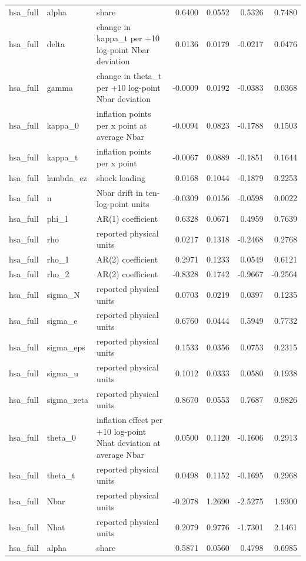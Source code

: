 \begin{tabular}{lllrrrr}
hsa\_full & alpha & share & 0.6400 & 0.0552 & 0.5326 & 0.7480 \\
hsa\_full & delta & change in kappa\_t per +10 log-point Nbar deviation & 0.0136 & 0.0179 & -0.0217 & 0.0476 \\
hsa\_full & gamma & change in theta\_t per +10 log-point Nbar deviation & -0.0009 & 0.0192 & -0.0383 & 0.0368 \\
hsa\_full & kappa\_0 & inflation points per x point at average Nbar & -0.0094 & 0.0823 & -0.1788 & 0.1503 \\
hsa\_full & kappa\_t & inflation points per x point & -0.0067 & 0.0889 & -0.1851 & 0.1644 \\
hsa\_full & lambda\_ez & shock loading & 0.0168 & 0.1044 & -0.1879 & 0.2253 \\
hsa\_full & n & Nbar drift in ten-log-point units & -0.0309 & 0.0156 & -0.0598 & 0.0022 \\
hsa\_full & phi\_1 & AR(1) coefficient & 0.6328 & 0.0671 & 0.4959 & 0.7639 \\
hsa\_full & rho & reported physical units & 0.0217 & 0.1318 & -0.2468 & 0.2768 \\
hsa\_full & rho\_1 & AR(2) coefficient & 0.2971 & 0.1233 & 0.0549 & 0.6121 \\
hsa\_full & rho\_2 & AR(2) coefficient & -0.8328 & 0.1742 & -0.9667 & -0.2564 \\
hsa\_full & sigma\_N & reported physical units & 0.0703 & 0.0219 & 0.0397 & 0.1235 \\
hsa\_full & sigma\_e & reported physical units & 0.6760 & 0.0444 & 0.5949 & 0.7732 \\
hsa\_full & sigma\_eps & reported physical units & 0.1533 & 0.0356 & 0.0753 & 0.2315 \\
hsa\_full & sigma\_u & reported physical units & 0.1012 & 0.0333 & 0.0580 & 0.1938 \\
hsa\_full & sigma\_zeta & reported physical units & 0.8670 & 0.0553 & 0.7687 & 0.9826 \\
hsa\_full & theta\_0 & inflation effect per +10 log-point Nhat deviation at average Nbar & 0.0500 & 0.1120 & -0.1606 & 0.2913 \\
hsa\_full & theta\_t & reported physical units & 0.0498 & 0.1152 & -0.1695 & 0.2968 \\
hsa\_full & Nbar & reported physical units & -0.2078 & 1.2690 & -2.5275 & 1.9300 \\
hsa\_full & Nhat & reported physical units & 0.2079 & 0.9776 & -1.7301 & 2.1461 \\
hsa\_full & alpha & share & 0.5871 & 0.0560 & 0.4798 & 0.6985 \\

\end{tabular}
